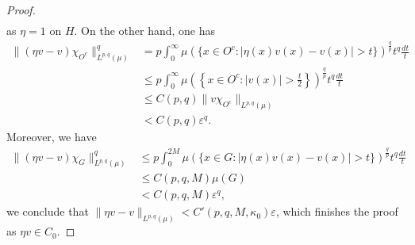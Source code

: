 \documentclass[10pt,a4paper]{amsart}
\begin{document}
\begin{proof}
\begin{align*}
\end{align*}
as $\eta=1$ on $H$. On the other hand, one has
\begin{align*}
\|(\eta v-v)\chi_{O^{c}}\|_{L^{p,q}(\mu)}^{q}&=p\int_{0}^{\infty}\mu(\{x\in O^{c}:|\eta(x)v(x)-v(x)|>t\})^{\frac{q}{p}}t^{q}\frac{dt}{t}\\
&\leq p\int_{0}^{\infty}\mu\left(\left\{x\in O^{c}:|v(x)|>\frac{t}{2}\right\}\right)^{\frac{q}{p}}t^{q}\frac{dt}{t}\\
&\leq C(p,q)\|v\chi_{O^{c}}\|_{L^{p,q}(\mu)}\\
&<C(p,q)\varepsilon^{q}.
\end{align*}
Moreover, we have
\begin{align*}
\|(\eta v-v)\chi_{G}\|_{L^{p,q}(\mu)}^{q}&\leq p\int_{0}^{2M}\mu(\{x\in G:|\eta(x)v(x)-v(x)|>t\})^{\frac{q}{p}}t^{q}\frac{dt}{t}\\
&\leq C(p,q,M)\mu(G)\\
&<C(p,q,M)\varepsilon^{q},
\end{align*}
we conclude that $\|\eta v-v\|_{L^{p,q}(\mu)}<C'(p,q,M,\kappa_{0})\varepsilon$, which finishes the proof as $\eta v\in C_{0}$.
\end{proof}
\end{document}
